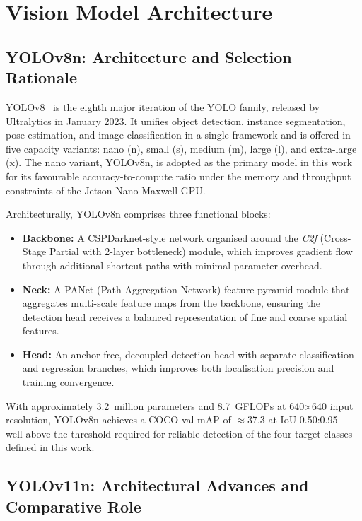 \documentclass[12pt,a4paper]{report}
\begin{document}
\section{Vision Model Architecture}

\subsection{YOLOv8n: Architecture and Selection Rationale}

YOLOv8~\cite{Jocher2023} is the eighth major iteration of the YOLO family, released by Ultralytics in January 2023. It unifies object detection, instance segmentation, pose estimation, and image classification in a single framework and is offered in five capacity variants: nano (n), small (s), medium (m), large (l), and extra-large (x). The nano variant, YOLOv8n, is adopted as the primary model in this work for its favourable accuracy-to-compute ratio under the memory and throughput constraints of the Jetson Nano Maxwell GPU.

Architecturally, YOLOv8n comprises three functional blocks:
\begin{itemize}
    \item \textbf{Backbone:} A CSPDarknet-style network organised around the \emph{C2f} (Cross-Stage Partial with 2-layer bottleneck) module, which improves gradient flow through additional shortcut paths with minimal parameter overhead.
    \item \textbf{Neck:} A PANet (Path Aggregation Network) feature-pyramid module that aggregates multi-scale feature maps from the backbone, ensuring the detection head receives a balanced representation of fine and coarse spatial features.
    \item \textbf{Head:} An anchor-free, decoupled detection head with separate classification and regression branches, which improves both localisation precision and training convergence.
\end{itemize}

With approximately 3.2~million parameters and 8.7~GFLOPs at 640$\times$640 input resolution, YOLOv8n achieves a COCO val mAP of $\approx$37.3 at IoU 0.50:0.95---well above the threshold required for reliable detection of the four target classes defined in this work.

\subsection{YOLOv11n: Architectural Advances and Comparative Role}
\end{document}
